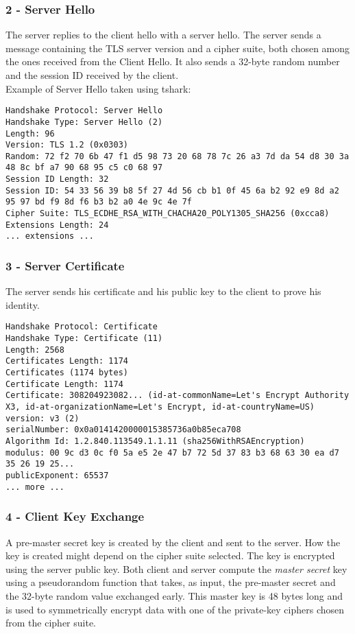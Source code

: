 \subsubsection{2 - Server Hello}
The server replies to the client hello with a server hello. The server sends a message containing the TLS server version and a cipher suite, both chosen among the ones received from the Client Hello. It also sends a 32-byte random number and the session ID received by the client.\\
Example of Server Hello taken using tshark:
\begin{lstlisting}
Handshake Protocol: Server Hello
Handshake Type: Server Hello (2)
Length: 96
Version: TLS 1.2 (0x0303)
Random: 72 f2 70 6b 47 f1 d5 98 73 20 68 78 7c 26 a3 7d da 54 d8 30 3a 48 8c bf a7 90 68 95 c5 c0 68 97
Session ID Length: 32
Session ID: 54 33 56 39 b8 5f 27 4d 56 cb b1 0f 45 6a b2 92 e9 8d a2 95 97 bd f9 8d f6 b3 b2 a0 4e 9c 4e 7f
Cipher Suite: TLS_ECDHE_RSA_WITH_CHACHA20_POLY1305_SHA256 (0xcca8)
Extensions Length: 24
... extensions ...
\end{lstlisting}

\subsubsection{3 - Server Certificate}
\par
The server sends his certificate and his public key to the client to prove his identity.\\
\begin{lstlisting}
Handshake Protocol: Certificate
Handshake Type: Certificate (11)
Length: 2568
Certificates Length: 1174
Certificates (1174 bytes)
Certificate Length: 1174
Certificate: 308204923082... (id-at-commonName=Let's Encrypt Authority X3, id-at-organizationName=Let's Encrypt, id-at-countryName=US)
version: v3 (2)
serialNumber: 0x0a0141420000015385736a0b85eca708
Algorithm Id: 1.2.840.113549.1.1.11 (sha256WithRSAEncryption)
modulus: 00 9c d3 0c f0 5a e5 2e 47 b7 72 5d 37 83 b3 68 63 30 ea d7 35 26 19 25...
publicExponent: 65537
... more ...
\end{lstlisting}

\subsubsection{4 - Client Key Exchange}
\par
A pre-master secret key is created by the client and sent to the server. How the key is created might depend on the cipher suite selected. The key is encrypted using the server public key. Both client and server compute the \emph{master secret} key using a pseudorandom function that takes, as input, the pre-master secret and the 32-byte random value exchanged early. This master key is 48 bytes long and is used to symmetrically encrypt data with one of the private-key ciphers chosen from the cipher suite.

